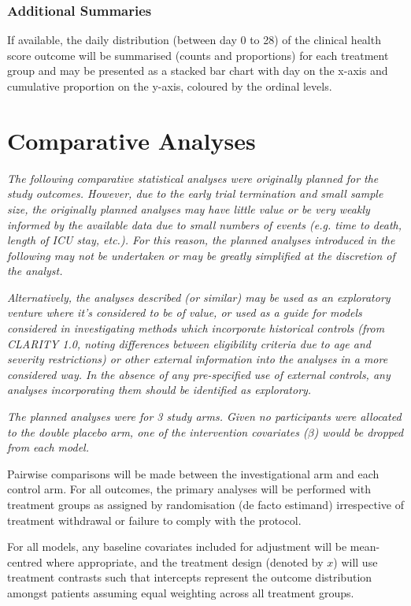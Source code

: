 \documentclass[11pt,parskip=half-]{scrartcl}
\begin{document}
\subsubsection{Additional Summaries}

If available, the daily distribution (between day 0 to 28) of the clinical health score outcome will be summarised (counts and proportions) for each treatment group and may be presented as a stacked bar chart with day on the x-axis and cumulative proportion on the y-axis, coloured by the ordinal levels.

\clearpage

\section{Comparative Analyses}

\textit{The following comparative statistical analyses were originally planned for the study outcomes. However, due to the early trial termination and small sample size, the originally planned analyses may have little value or be very weakly informed by the available data due to small numbers of events (e.g. time to death, length of ICU stay, etc.). For this reason, the planned analyses introduced in the following may not be undertaken or may be greatly simplified at the discretion of the analyst.}

\textit{Alternatively, the analyses described (or similar) may be used as an exploratory venture where it's considered to be of value, or used as a guide for models considered in investigating methods which incorporate historical controls (from CLARITY 1.0, noting differences between eligibility criteria due to age and severity restrictions) or other external information into the analyses in a more considered way. In the absence of any pre-specified use of external controls, any analyses incorporating them should be identified as exploratory.}

\textit{The planned analyses were for 3 study arms. Given no participants were allocated to the double placebo arm, one of the intervention covariates ($\beta$) would be dropped from each model.}

Pairwise comparisons will be made between the investigational arm and each control arm. For all outcomes, the primary analyses will be performed with treatment groups as assigned by randomisation (de facto estimand) irrespective of treatment withdrawal or failure to comply with the protocol.

For all models, any baseline covariates included for adjustment will be mean-centred where appropriate, and the treatment design (denoted by $x$) will use treatment contrasts such that intercepts represent the outcome distribution amongst patients assuming equal weighting across all treatment groups.
\end{document}
